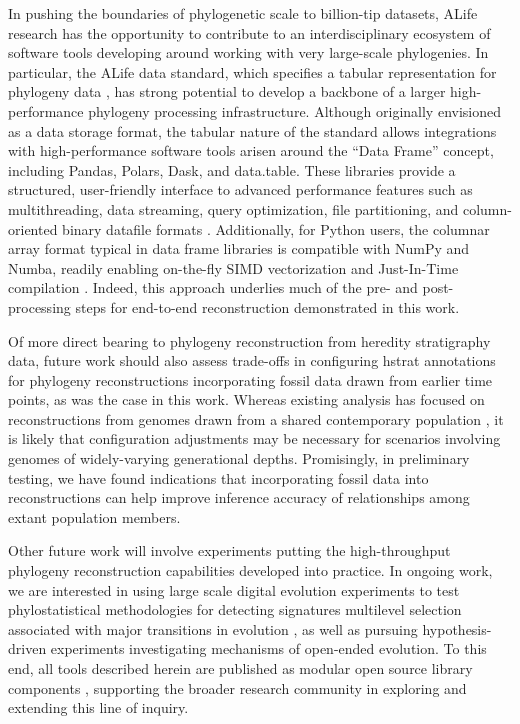 In pushing the boundaries of phylogenetic scale to billion-tip datasets, ALife research has the opportunity to contribute to an interdisciplinary ecosystem of software tools developing around working with very large-scale phylogenies.
In particular, the ALife data standard, which specifies a tabular representation for phylogeny data \citep{Lalejini2019data}, has strong potential to develop a backbone of a larger high-performance phylogeny processing infrastructure.
Although originally envisioned as a data storage format, the tabular nature of the standard allows integrations with high-performance software tools arisen around the ``Data Frame'' concept, including Pandas, Polars, Dask, and data.table.
These libraries provide a structured, user-friendly interface to advanced performance features such as multithreading, data streaming, query optimization, file partitioning, and column-oriented binary datafile formats \citep{mckinney2010data,datatable,vink2024polars,rocklin2015dask}.
Additionally, for Python users, the columnar array format typical in data frame libraries is compatible with NumPy and Numba, readily enabling on-the-fly SIMD vectorization and Just-In-Time compilation \citep{harris2020array,lam2015numba}.
Indeed, this approach underlies much of the pre- and post-processing steps for end-to-end reconstruction demonstrated in this work.

Of more direct bearing to phylogeny reconstruction from heredity stratigraphy data, future work should also assess trade-offs in configuring hstrat annotations for phylogeny reconstructions incorporating fossil data drawn from earlier time points, as was the case in this work.
Whereas existing analysis has focused on reconstructions from genomes drawn from a shared contemporary population \citep{moreno2025testing}, it is likely that configuration adjustments may be necessary for scenarios involving genomes of widely-varying generational depths.
Promisingly, in preliminary testing, we have found indications that incorporating fossil data into reconstructions can help improve inference accuracy of relationships among extant population members.

Other future work will involve experiments putting the high-throughput phylogeny reconstruction capabilities developed into practice.
In ongoing work, we are interested in using large scale digital evolution experiments to test phylostatistical methodologies for detecting signatures multilevel selection associated with major transitions in evolution \citep{BonettiFranceschi2024}, as well as pursuing hypothesis-driven experiments investigating mechanisms of open-ended evolution.
To this end, all tools described herein are published as modular open source library components \citep{moreno2024hstrat}, supporting the broader research community in exploring and extending this line of inquiry.
